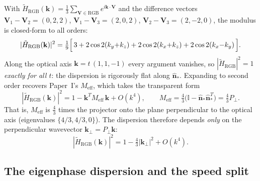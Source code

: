 With $\tilde{H}_\text{RGB}(\mathbf{k}) = \tfrac13\sum_{\mathbf{V}\in\text{RGB}}
e^{i\mathbf{k}\cdot\mathbf{V}}$ and the difference vectors
$\mathbf{V}_1-\mathbf{V}_2=(0,2,2)$, $\mathbf{V}_1-\mathbf{V}_3=(2,0,2)$,
$\mathbf{V}_2-\mathbf{V}_3=(2,-2,0)$, the modulus is closed-form to all
orders:
\begin{equation}
    |\tilde{H}_\text{RGB}(\mathbf{k})|^2
    = \tfrac19\Bigl[\,3
        + 2\cos 2(k_y{+}k_z)
        + 2\cos 2(k_x{+}k_z)
        + 2\cos 2(k_x{-}k_y)\,\Bigr].
    \label{eq:H2_exact}
\end{equation}
Along the optical axis $\mathbf{k}=t\,(1,1,-1)$ every argument vanishes, so
$|\tilde{H}_\text{RGB}|^2 = 1$ \emph{exactly for all $t$}: the dispersion
is rigorously flat along $\hat{\mathbf{n}}_*$.  Expanding to second order
recovers Paper~I's $M_\text{eff}$, which takes the transparent form
\begin{equation}
    |\tilde{H}_\text{RGB}(\mathbf{k})|^2 = 1 - \mathbf{k}^T M_\text{eff}\,\mathbf{k}
        + O(k^4),
    \qquad
    M_\text{eff} = \tfrac43\bigl(\mathbb{I} - \hat{\mathbf{n}}_*\hat{\mathbf{n}}_*^{T}\bigr)
        = \tfrac43 P_\perp .
    \label{eq:Meff_projector}
\end{equation}
That is, $M_\text{eff}$ is $\tfrac43$ times the projector onto the plane
perpendicular to the optical axis (eigenvalues $\{4/3,4/3,0\}$).  The
dispersion therefore depends \emph{only} on the perpendicular wavevector
$\mathbf{k}_\perp = P_\perp\mathbf{k}$:
\begin{equation}
    |\tilde{H}_\text{RGB}(\mathbf{k})|^2 = 1 - \tfrac43|\mathbf{k}_\perp|^2 + O(k^4).
    \label{eq:H2_perp}
\end{equation}

\subsection{The eigenphase dispersion and the speed split}
\label{subsec:speed_split}

